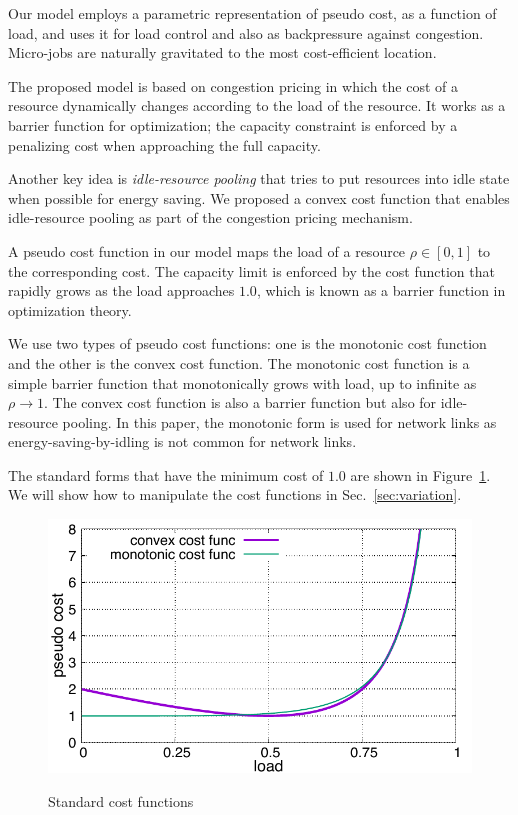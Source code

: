 
Our model employs a parametric representation of pseudo cost, as a
function of load, and uses it for load control and also as
backpressure against congestion.
Micro-jobs are naturally gravitated to the most cost-efficient
location.

The proposed model is based on congestion pricing in which the cost of
a resource dynamically changes according to the load of the resource.
It works as a barrier function for optimization; the capacity
constraint is enforced by a penalizing cost when approaching the full
capacity.

Another key idea is {\em idle-resource pooling} that tries to put resources
into idle state when possible for energy saving.
We proposed a convex cost function that enables idle-resource pooling
as part of the congestion pricing mechanism.

A pseudo cost function in our model maps the load of a resource
$\rho \in [0, 1]$ to the corresponding cost.
The capacity limit is enforced by the cost function that rapidly grows
as the load approaches $1.0$, which is known as a barrier function in
optimization theory. 

We use two types of pseudo cost functions: one is the monotonic cost
function and the other is the convex cost function.
The monotonic cost function is a simple barrier function that
monotonically grows with load, up to infinite as $\rho \to 1$.
The convex cost function is also a barrier function but also for
idle-resource pooling.
In this paper, the monotonic form is used for network links as
energy-saving-by-idling is not common for network links.

The standard forms that have the minimum cost of $1.0$ are
shown in Figure~\ref{fig:std_costfunc}. We will show how to manipulate
the cost functions in Sec.~\ref{sec:variation}.

\begin{figure}[tb]
  \begin{center}
    \includegraphics[width=1.0\columnwidth]{costfunc.pdf}
    \vspace{-2.0ex}
    \caption{Standard cost functions}
    \label{fig:std_costfunc}
  \end{center}
\end{figure}

